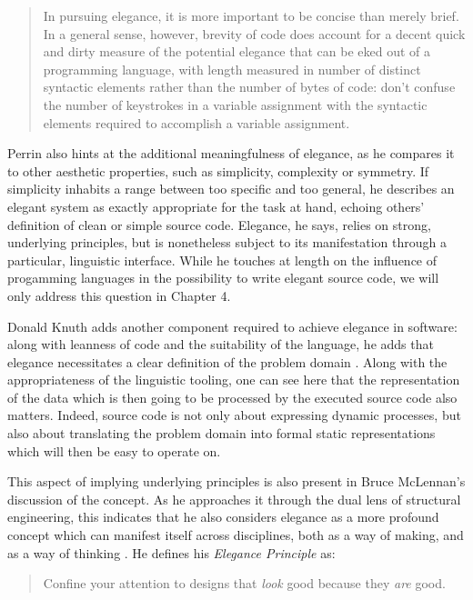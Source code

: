 \begin{quote}
  In pursuing elegance, it is more important to be concise than merely brief. In a general sense, however, brevity of code does account for a decent quick and dirty measure of the potential elegance that can be eked out of a programming language, with length measured in number of distinct syntactic elements rather than the number of bytes of code: don't confuse the number of keystrokes in a variable assignment with the syntactic elements required to accomplish a variable assignment. \citep{perrin_itlog_2006}
\end{quote}

Perrin also hints at the additional meaningfulness of elegance, as he compares it to other aesthetic properties, such as simplicity, complexity or symmetry. If simplicity inhabits a range between too specific and too general, he describes an elegant system as exactly appropriate for the task at hand, echoing others' definition of clean or simple source code. Elegance, he says, relies on strong, underlying principles, but is nonetheless subject to its manifestation through a particular, linguistic interface. While he touches at length on the influence of progamming languages in the possibility to write elegant source code, we will only address this question in Chapter 4.

Donald Knuth adds another component required to achieve elegance in software: along with leanness of code and the suitability of the language, he adds that elegance necessitates a clear definition of the problem domain \citep{fuller_software_2008}. Along with the appropriateness of the linguistic tooling, one can see here that the representation of the data which is then going to be processed by the executed source code also matters. Indeed, source code is not only about expressing dynamic processes, but also about translating the problem domain into formal static representations which will then be easy to operate on.

This aspect of implying underlying principles is also present in Bruce McLennan's discussion of the concept. As he approaches it through the dual lens of structural engineering, this indicates that he also considers elegance as a more profound concept which can manifest itself across disciplines, both as a way of making, and as a way of thinking \citep{mclennan_who_1997}. He defines his \emph{Elegance Principle} as:

\begin{quote}
  Confine your attention to designs that \emph{look} good because they \emph{are} good. \citep{mclennan_who_1997}
\end{quote}


